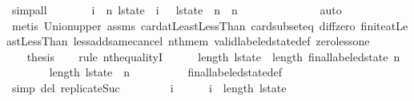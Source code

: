 \begin{isabellebody}
\ simp{\isacharunderscore}all\isanewline
\ \ \isamarkupfalse%
\isanewline
\ \ \isamarkupfalse%
\ {\isachardoublequoteopen}{\isasymforall}\ i\ {\isacharless}\ n{\isachardot}\ l{\isacharunderscore}state\ {\isacharbang}\ i\ {\isacharequal}\ {\isacharbraceleft}{\isacharbraceright}{\isachardoublequoteclose}\ {\isachardoublequoteopen}l{\isacharunderscore}state\ {\isacharbang}\ n\ {\isacharequal}\ {\isacharbraceleft}{}{\isachardot}{\isachardot}{\isacharless}n{\isacharbraceright}{\isachardoublequoteclose}\isanewline
\ \ \ \ \ \isamarkupfalse%
\ {\isacharminus}\isanewline
\ \ \ \ \ \isamarkupfalse%
\ auto{\isacharbrackleft}{}{\isacharbrackright}\isanewline
\ \ \ \ \isamarkupfalse%
\ {\isacharparenleft}metis\ Union{\isacharunderscore}upper\ assms{\isacharparenleft}{}{\isacharparenright}\ card{\isacharunderscore}atLeastLessThan\ card{\isacharunderscore}subset{\isacharunderscore}eq\ diff{\isacharunderscore}zero\ finite{\isacharunderscore}atLeastLessThan\ less{\isacharunderscore}add{\isacharunderscore}same{\isacharunderscore}cancel{}\ nth{\isacharunderscore}mem\ valid{\isacharunderscore}labeled{\isacharunderscore}state{\isacharunderscore}def\ zero{\isacharunderscore}less{\isacharunderscore}one{\isacharparenright}\isanewline
\ \ \ \ \isamarkupfalse%
\isanewline
\ \ \isamarkupfalse%
\ {\isacharquery}thesis\isanewline
\ \ \isamarkupfalse%
\ {\isacharparenleft}rule\ nth{\isacharunderscore}equalityI{\isacharparenright}\isanewline
\ \ \ \ \isamarkupfalse%
\ {\isachardoublequoteopen}length\ l{\isacharunderscore}state\ {\isacharequal}\ length\ {\isacharparenleft}final{\isacharunderscore}labeled{\isacharunderscore}state\ n{\isacharparenright}{\isachardoublequoteclose}\isanewline
\ \ \ \ \ \ \isamarkupfalse%
\ {\isacharbackquoteopen}length\ l{\isacharunderscore}state\ {\isacharequal}\ n\ {\isacharplus}\ {}{\isacharbackquoteclose}\isanewline
\ \ \ \ \ \ \isamarkupfalse%
\ final{\isacharunderscore}labeled{\isacharunderscore}state{\isacharunderscore}def\isanewline
\ \ \ \ \ \ \isamarkupfalse%
\ {\isacharparenleft}simp\ del{\isacharcolon}\ replicate{\isacharunderscore}Suc{\isacharparenright}\isanewline
\ \ \isamarkupfalse%
\isanewline
\ \ \ \ \isamarkupfalse%
\ i\isanewline
\ \ \ \ \isamarkupfalse%
\ {\isachardoublequoteopen}i\ {\isacharless}\ length\ l{\isacharunderscore}state{\isachardoublequoteclose}\isanewline

\end{isabellebody}
